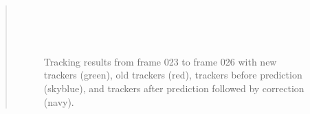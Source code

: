 \documentclass[11pt]{article}
\begin{document}
\begin{quote}
\begin{figure}[h]
    \centering
     \\
     \\
     \\
    \caption{Tracking results from frame 023 to frame 026 with new trackers (green), old trackers (red), trackers before prediction (skyblue), and trackers after prediction followed by correction (navy).}
    \label{fig:q6-1}
\end{figure}


\end{quote}
\end{document}
